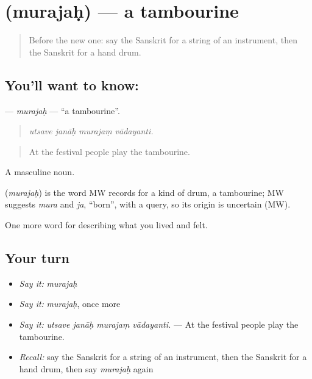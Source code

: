 \section[\texorpdfstring{\sk{मुरजः} (murajaḥ)}{मुरजः (murajaḥ)}]{ (murajaḥ) — a tambourine}

\label{lesson:SA-C521-murajah}



\begin{quote}
Before the new one: say the Sanskrit for a string of an instrument, then the Sanskrit for a hand drum.
\end{quote}

\subsection*{You'll want to know: }
\textbf{} — \emph{murajaḥ} — \textquotedblleft{}a tambourine\textquotedblright{}.

\begin{quote}
   
\end{quote}

\begin{quote}
\emph{utsave janāḥ murajaṃ vādayanti.}
\end{quote}

\begin{quote}
At the festival people play the tambourine.
\end{quote}

A masculine noun.

\begin{cousinweb}
\textbf{} (\emph{murajaḥ}) is the word MW records for a kind of drum, a tambourine; MW suggests \emph{mura} and \emph{ja}, \textquotedblleft{}born\textquotedblright{}, with a query, so its origin is uncertain (MW).
\end{cousinweb}

\begin{grammarlens}[title={What you've built}]
One more word for describing what you lived and felt.
\end{grammarlens}

\subsection*{Your turn}
\begin{itemize}
\raggedright
  \item \emph{Say it:} \emph{murajaḥ}
  \item \emph{Say it:} \emph{murajaḥ}, once more
  \item \emph{Say it:} \emph{utsave janāḥ murajaṃ vādayanti.} — At the festival people play the tambourine.
  \item \emph{Recall:} say the Sanskrit for a string of an instrument, then the Sanskrit for a hand drum, then say \emph{murajaḥ} again
\end{itemize}

